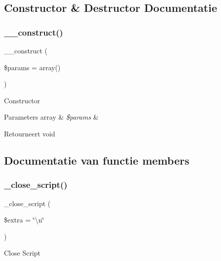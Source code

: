 \subsection{Constructor \& Destructor Documentatie}
\mbox{\label{class_c_i___javascript_a568ecdb0d73d2a870f33189739922a50}} 
\subsubsection{\texorpdfstring{\_\_construct()}{\_\_construct()}}
{\footnotesize\ttfamily \+\_\+\+\_\+construct (\begin{DoxyParamCaption}\item[{}]{\$params = {\ttfamily array()} }\end{DoxyParamCaption})}

Constructor


\begin{DoxyParams}[1]{Parameters}
array & {\em \$params} & \\
\hline
\end{DoxyParams}
\begin{DoxyReturn}{Retourneert}
void 
\end{DoxyReturn}


\subsection{Documentatie van functie members}
\mbox{\label{class_c_i___javascript_a83a39b1edd6e0ec9bd6c93de99a0d4d8}} 
\subsubsection{\texorpdfstring{\_close\_script()}{\_close\_script()}}
{\footnotesize\ttfamily \+\_\+close\+\_\+script (\begin{DoxyParamCaption}\item[{}]{\$extra = {\ttfamily \char`\"{}\textbackslash{}n\char`\"{}} }\end{DoxyParamCaption})\hspace{0.3cm}{\ttfamily [protected]}}

Close Script

